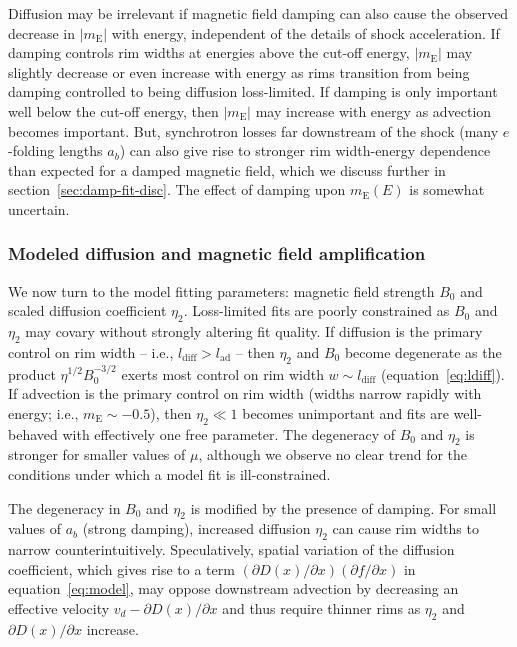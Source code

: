 \documentclass[iop, apj, numberedappendix]{emulateapj}
\newcommand*{\mt}{\mathrm}
\newcommand*{\ptl}{\partial}
\newcommand*{\mE}{m_\mt{E}}
\begin{document}
Diffusion may be irrelevant if magnetic field damping can also cause the
observed decrease in $|\mE|$ with energy, independent of the details of shock
acceleration.  If damping controls rim widths at energies above the cut-off
energy, $|\mE|$ may slightly decrease or even increase with energy as rims
transition from being damping controlled to being diffusion loss-limited.  If
damping is only important well below the cut-off energy, then $|\mE|$ may
increase with energy as advection becomes important.  But, synchrotron
losses far downstream of the shock (many $e$-folding lengths $a_b$) can also
give rise to stronger rim width-energy dependence than expected for a damped
magnetic field, which we discuss further in section~\ref{sec:damp-fit-disc}.
The effect of damping upon $\mE(E)$ is somewhat uncertain.

\subsubsection{Modeled diffusion and magnetic field amplification}

We now turn to the model fitting parameters: magnetic field strength $B_0$ and
scaled diffusion coefficient $\eta_2$.  Loss-limited fits are poorly
constrained as $B_0$ and $\eta_2$ may covary without strongly altering fit
quality.  If diffusion is the primary control on rim width -- i.e.,
$l_{\mt{diff}} > l_{\mt{ad}}$ -- then $\eta_2$ and $B_0$ become degenerate as
the product $\eta^{1/2} B_0^{-3/2}$ exerts most control on rim width $w \sim
l_{\mt{diff}}$ (equation~\eqref{eq:ldiff}).  If advection is the primary
control on rim width (widths narrow rapidly with energy; i.e., $\mE \sim
-0.5$), then $\eta_2 \ll 1$ becomes unimportant and fits are well-behaved with
effectively one free parameter.  The degeneracy of $B_0$ and $\eta_2$ is
stronger for smaller values of $\mu$, although we observe no clear trend for
the conditions under which a model fit is ill-constrained.

The degeneracy in $B_0$ and $\eta_2$ is modified by the presence of damping.
For small values of $a_b$ (strong damping), increased diffusion $\eta_2$ can
cause rim widths to narrow counterintuitively.  Speculatively, spatial
variation of the diffusion coefficient, which gives rise to a
term $(\ptl D(x) / \ptl x) (\ptl f/\ptl x)$ in equation~\eqref{eq:model}, may
oppose downstream advection by decreasing an effective velocity $v_d - \ptl
D(x) / \ptl x$ and thus require thinner rims as $\eta_2$ and $\ptl D(x) / \ptl
x$ increase.
\end{document}
